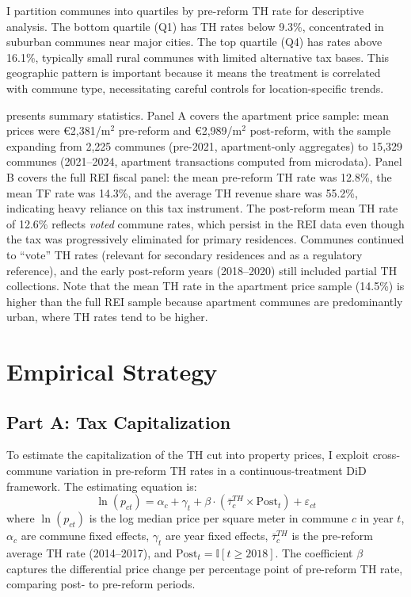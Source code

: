 \documentclass[12pt]{article}
\newcommand{\ind}{\mathbb{I}}
\begin{document}
I partition communes into quartiles by pre-reform TH rate for descriptive analysis. The bottom quartile (Q1) has TH rates below 9.3\%, concentrated in suburban communes near major cities. The top quartile (Q4) has rates above 16.1\%, typically small rural communes with limited alternative tax bases. This geographic pattern is important because it means the treatment is correlated with commune type, necessitating careful controls for location-specific trends.

 presents summary statistics. Panel A covers the apartment price sample: mean prices were \euro{}2,381/m$^2$ pre-reform and \euro{}2,989/m$^2$ post-reform, with the sample expanding from 2,225 communes (pre-2021, apartment-only aggregates) to 15,329 communes (2021--2024, apartment transactions computed from microdata). Panel B covers the full REI fiscal panel: the mean pre-reform TH rate was 12.8\%, the mean TF rate was 14.3\%, and the average TH revenue share was 55.2\%, indicating heavy reliance on this tax instrument. The post-reform mean TH rate of 12.6\% reflects \emph{voted} commune rates, which persist in the REI data even though the tax was progressively eliminated for primary residences. Communes continued to ``vote'' TH rates (relevant for secondary residences and as a regulatory reference), and the early post-reform years (2018--2020) still included partial TH collections. Note that the mean TH rate in the apartment price sample (14.5\%) is higher than the full REI sample because apartment communes are predominantly urban, where TH rates tend to be higher.




\section{Empirical Strategy}

\subsection{Part A: Tax Capitalization}

To estimate the capitalization of the TH cut into property prices, I exploit cross-commune variation in pre-reform TH rates in a continuous-treatment DiD framework. The estimating equation is:
\begin{equation}
\ln(p_{ct}) = \alpha_c + \gamma_t + \beta \cdot (\bar\tau^{TH}_c \times \text{Post}_t) + \varepsilon_{ct}
\label{eq:partA}
\end{equation}
where $\ln(p_{ct})$ is the log median price per square meter in commune $c$ in year $t$, $\alpha_c$ are commune fixed effects, $\gamma_t$ are year fixed effects, $\bar\tau^{TH}_c$ is the pre-reform average TH rate (2014--2017), and $\text{Post}_t = \ind[t \geq 2018]$. The coefficient $\beta$ captures the differential price change per percentage point of pre-reform TH rate, comparing post- to pre-reform periods.
\end{document}
